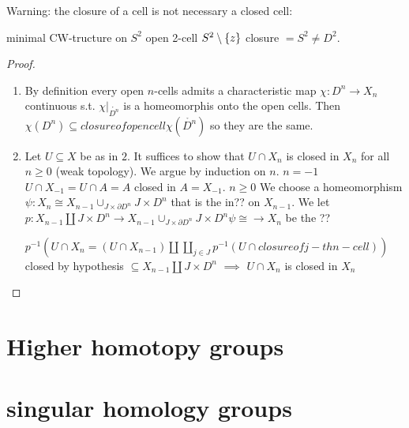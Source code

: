 \documentclass{TemplateLecture}
\begin{document}
Warning: the closure of a cell is not necessary a closed cell:

minimal CW-tructure on \(S^2\) open 2-cell \(S^2\setminus \{z\}\) closure \(= S^2 \neq D^2\).

\begin{proof}
    \begin{enumerate}
        \item By definition every open \(n\)-cells admits a characteristic map \(\chi\colon D^n \to X_n\) continuous s.t. \(\chi\rvert_{\mathring{D^n}}\) is a homeomorphis onto the open cells. Then \(\chi(D^n) \subseteq closure of open cell \chi(\mathring{D^n})\) so they are the same.

        \item Let \(U\subseteq X\) be as in \(2\). It suffices to show that \(U\cap X_n\) is closed in \(X_n\) for all \(n \geq 0\) (weak topology). We argue by induction on \(n\).
        \(n = -1\) \(U\cap X_{-1} = U\cap A = A\) closed in \(A = X_{-1}\).
        \(n \geq 0\) We choose a homeomorphism \(\psi\colon X_n \cong X_{n-1} \cup_{J\times \partial D^n} J\times D^n\) that is the in?? on \(X_{n-1}\). We let \(p\colon X_{n-1} \amalg J\times D^n \to X_{n-1} \cup_{J\times \partial D^n} J\times D^n \psi \cong \to X_n\) be the ?? 

        \(p^{-1}(U\cap X_n = (U\cap X_{n-1}) \amalg \coprod_{j \in J} p^{-1}(U\cap closure of j-th n-cell))\) closed by hypothesis \(\subseteq X_{n-1} \amalg J\times D^n\)
        \(\implies\) \(U\cap X_n\) is closed in \(X_n\)
    \end{enumerate}
\end{proof}













\section{Higher homotopy groups}

\section{singular homology groups}
\end{document}
